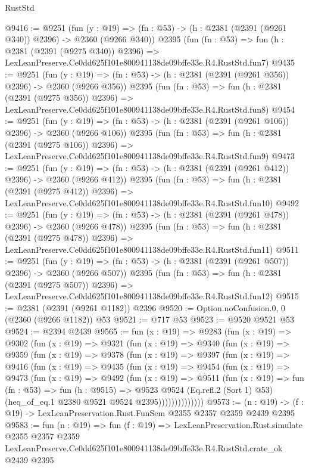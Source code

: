 \begin{lexlean}{RustStd}
\begin{coremodule}
@9416 := @9251
    (fun (y : @19) => (fn : @53) -> (h : @2381 (@2391 (@9261 @340)) @2396) -> @2360 (@9266 @340))
    @2395
    (fun (fn : @53) =>
    fun (h : @2381 (@2391 (@9275 @340)) @2396) =>
    LexLeanPreserve.Ce0dd625f101e800941138de09bffe33e.R4.RustStd.fun7)
@9435 := @9251
    (fun (y : @19) => (fn : @53) -> (h : @2381 (@2391 (@9261 @356)) @2396) -> @2360 (@9266 @356))
    @2395
    (fun (fn : @53) =>
    fun (h : @2381 (@2391 (@9275 @356)) @2396) =>
    LexLeanPreserve.Ce0dd625f101e800941138de09bffe33e.R4.RustStd.fun8)
@9454 := @9251
    (fun (y : @19) => (fn : @53) -> (h : @2381 (@2391 (@9261 @106)) @2396) -> @2360 (@9266 @106))
    @2395
    (fun (fn : @53) =>
    fun (h : @2381 (@2391 (@9275 @106)) @2396) =>
    LexLeanPreserve.Ce0dd625f101e800941138de09bffe33e.R4.RustStd.fun9)
@9473 := @9251
    (fun (y : @19) => (fn : @53) -> (h : @2381 (@2391 (@9261 @412)) @2396) -> @2360 (@9266 @412))
    @2395
    (fun (fn : @53) =>
    fun (h : @2381 (@2391 (@9275 @412)) @2396) =>
    LexLeanPreserve.Ce0dd625f101e800941138de09bffe33e.R4.RustStd.fun10)
@9492 := @9251
    (fun (y : @19) => (fn : @53) -> (h : @2381 (@2391 (@9261 @478)) @2396) -> @2360 (@9266 @478))
    @2395
    (fun (fn : @53) =>
    fun (h : @2381 (@2391 (@9275 @478)) @2396) =>
    LexLeanPreserve.Ce0dd625f101e800941138de09bffe33e.R4.RustStd.fun11)
@9511 := @9251
    (fun (y : @19) => (fn : @53) -> (h : @2381 (@2391 (@9261 @507)) @2396) -> @2360 (@9266 @507))
    @2395
    (fun (fn : @53) =>
    fun (h : @2381 (@2391 (@9275 @507)) @2396) =>
    LexLeanPreserve.Ce0dd625f101e800941138de09bffe33e.R4.RustStd.fun12)
@9515 := @2381 (@2391 (@9261 @1182)) @2396
@9520 := Option.noConfusion.{0, 0} (@2360 (@9266 @1182)) @53
@9521 := @717 @53
@9523 := @9520 @9521 @53
@9524 := @2394 @2439
@9565 := fun (x : @19) =>
  @9283
    (fun (x : @19) =>
    @9302
      (fun (x : @19) =>
      @9321
        (fun (x : @19) =>
        @9340
          (fun (x : @19) =>
          @9359
            (fun (x : @19) =>
            @9378
              (fun (x : @19) =>
              @9397
                (fun (x : @19) =>
                @9416
                  (fun (x : @19) =>
                  @9435
                    (fun (x : @19) =>
                    @9454
                      (fun (x : @19) =>
                      @9473
                        (fun (x : @19) =>
                        @9492
                          (fun (x : @19) =>
                          @9511
                            (fun (x : @19) =>
                            fun (fn : @53) =>
                            fun (h : @9515) =>
                            @9523
                              @9524
                              (Eq.refl.{2} (Sort 1) @53)
                              (heq_of_eq.{1} @2380 @9521 @9524 @2395))))))))))))))
@9573 := (n : @19) -> (f : @19) -> LexLeanPreservation.Rust.FunSem @2355 @2357 @2359 @2439 @2395
@9583 := fun (n : @19) =>
  fun (f : @19) =>
  LexLeanPreservation.Rust.simulate
    @2355
    @2357
    @2359
    LexLeanPreserve.Ce0dd625f101e800941138de09bffe33e.R4.RustStd.crate_ok
    @2439
    @2395
\end{coremodule}
\end{lexlean}
